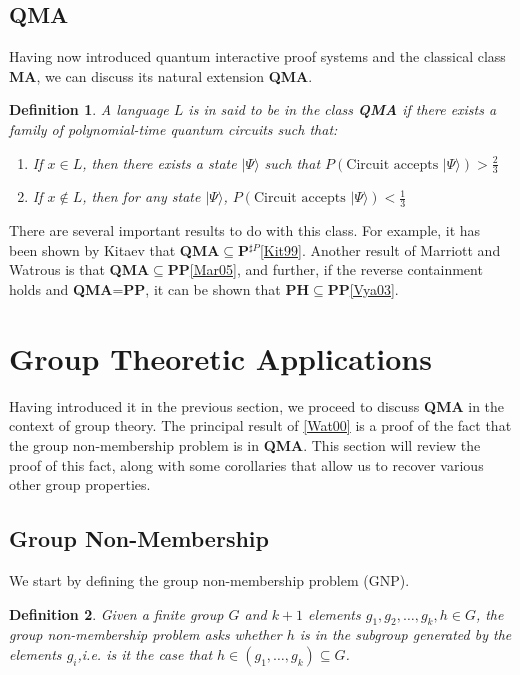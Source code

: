 \documentclass[12pt]{article}
\newtheorem*{defn}{Definition}
\newcommand{\ket}[1]{\vert #1 \rangle}
\begin{document}
	\subsection{QMA}
	Having now introduced quantum interactive proof systems and the classical class \textbf{MA}, we can discuss its natural extension \textbf{QMA}.
	\begin{defn}
		A language $L$ is in said to be in the class \textbf{QMA} if there exists a family of polynomial-time quantum circuits such that:
		\begin{enumerate}
			\item If $x\in L$, then there exists a state $\ket{\Psi}$ such that $P(\text{Circuit accepts } \ket{\Psi})>\frac{2}{3}$
			\item If $x\notin L$, then for any state $\ket{\Psi}$, $P(\text{Circuit accepts } \ket{\Psi})<\frac{1}{3}$
		\end{enumerate}
	\end{defn}
	 There are several important results to do with this class. For example, it has been shown by Kitaev that \textbf{QMA}$\subseteq$\textbf{P$^{\sharp P}$}\hyperref[kit99]{[Kit99]}. Another result of Marriott and Watrous is that \textbf{QMA}$\subseteq$\textbf{PP}\hyperref[mar05]{[Mar05]}, and further, if the reverse containment holds and \textbf{QMA}=\textbf{PP}, it can be shown that \textbf{PH}$\subseteq$\textbf{PP}\hyperref[vya03]{[Vya03]}.
    \section{Group Theoretic Applications}
    Having introduced it in the previous section, we proceed to discuss \textbf{QMA} in the context of group theory. The principal result of \hyperref[wat00]{[Wat00]} is a proof of the fact that the group non-membership problem is in \textbf{QMA}. This section will review the proof of this fact, along with some corollaries that allow us to recover various other group properties. 
    \subsection{Group Non-Membership}
    We start by defining the group non-membership problem (GNP).
    \begin{defn}
    	Given a finite group $G$ and $k+1$ elements $g_1,g_2,\dots,g_k,h\in G$, the group non-membership problem asks whether $h$ is in the subgroup generated by the elements $g_i$,i.e. is it the case that $h\in (g_1,\dots,g_k)\subseteq G$.
    \end{defn}
\end{document}
